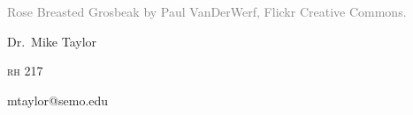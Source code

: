 \documentclass[t]{beamer}
\begin{document}


{
\begin{frame}[b,plain]
	\tiny\textcolor{gray}{Rose Breasted Grosbeak by Paul VanDerWerf, Flickr Creative Commons.}
\end{frame}
}

{
\begin{frame}[t]
	\large
	\vspace{2ex}
	\hangpara\hspace{15em} Dr.~Mike Taylor

	\hangpara\hspace{15em} \textsc{rh} 217
	


	\hangpara\hspace{15em} mtaylor@semo.edu
	

\end{frame}
}


%
%
%
%
%
\end{document}
